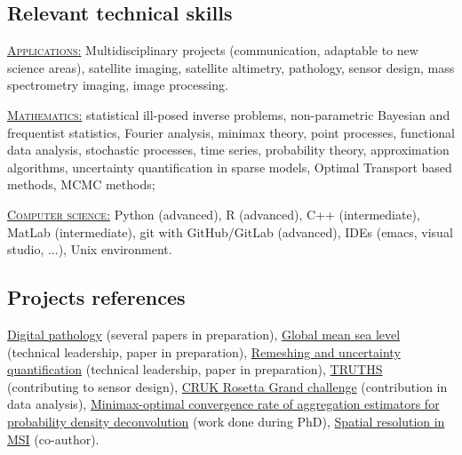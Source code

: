 \documentclass[11pt,a4paper,sans,colorlinks,linkcolor=blue]{moderncv} %
\begin{document}
\medskip

\subsection{Relevant technical skills}
\begin{multicols}{2}
\underline{\textsc{Applications:}}
Multidisciplinary projects (communication, adaptable to new science areas), satellite imaging, satellite altimetry, pathology, sensor design, mass spectrometry imaging, image processing.

\underline{\textsc{Mathematics:}}
statistical ill-posed inverse problems, non-parametric Bayesian and frequentist statistics, Fourier analysis, minimax theory, point processes, functional data analysis, stochastic processes, time series, probability theory, approximation algorithms, uncertainty quantification in sparse models, Optimal Transport based methods, MCMC methods;

\underline{\textsc{Computer science:}} Python (advanced), R (advanced), C++ (intermediate), MatLab (intermediate), git with GitHub/GitLab (advanced), IDEs (emacs, visual studio, ...), Unix environment. 

\end{multicols}

\subsection{Projects references}
\href{https://www.npl.co.uk/news/next-generation-of-digital-pathology}{Digital pathology} (several papers in preparation), 
\href{https://www.bipmwmo22.org/submissions/submission/137}{Global mean sea level} (technical leadership, paper in preparation), \href{https://www.bipmwmo22.org/submissions/submission/138}{Remeshing and uncertainty quantification} (technical leadership, paper in preparation), \href{https://www.npl.co.uk/earth-observation/truths}{TRUTHS} (contributing to sensor design), \href{https://www.npl.co.uk/grand-challenge}{CRUK Rosetta Grand challenge} (contribution in data analysis),
\href{https://arxiv.org/pdf/2102.01037}{Minimax-optimal convergence rate of aggregation estimators for probability density deconvolution} (work done during PhD),
\href{https://pubs.acs.org/doi/abs/10.1021/acs.analchem.1c02470}{Spatial resolution in MSI} (co-author).

\end{document}

